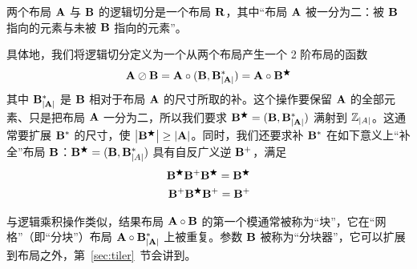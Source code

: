 \label{sec:logical_divide}

两个布局 $\mathbf{A}$ 与 $\mathbf{B}$ 的逻辑切分是一个布局 $\mathbf{R}$，其中“布局 $\mathbf{A}$ 被一分为二：被 $\mathbf{B}$ 指向的元素与未被 $\mathbf{B}$ 指向的元素”。

具体地，我们将逻辑切分定义为一个从两个布局产生一个 2 阶布局的函数
\begin{align*}
\mathbf{A} \oslash \mathbf{B} = \mathbf{A} \circ (\mathbf{B}, \mathbf{B}^*_{\left| {\mathbf{A}} \right|}) = \mathbf{A} \circ \mathbf{B}^\bigstar
\end{align*}
其中 $\mathbf{B}^*_{\left| {\mathbf{A}} \right|}$ 是 $\mathbf{B}$ 相对于布局 $\mathbf{A}$ 的尺寸所取的补。这个操作要保留 $\mathbf{A}$ 的全部元素、只是把布局 $\mathbf{A}$ 一分为二，所以我们要求 $\mathbf{B}^\bigstar = (\mathbf{B},\mathbf{B}^*_{\left| {\mathbf{A}} \right|})$ 满射到 $\mathbb{Z}_{\left| {A} \right|}$。这通常要扩展 $\mathbf{B}^*$ 的尺寸，使 $\left| {\mathbf{B}^\bigstar} \right| \geq \left| {\mathbf{A}} \right|$。同时，我们还要求补 $\mathbf{B}^*$ 在如下意义上“补全”布局 $\mathbf{B}$：$\mathbf{B}^\bigstar = (\mathbf{B},\mathbf{B}^*_{\left| {A} \right|})$ 具有自反广义逆 $\mathbf{B}^+$，满足
\begin{align}
\mathbf{B}^\bigstar \mathbf{B}^+ \mathbf{B}^\bigstar = \mathbf{B}^\bigstar \\
\mathbf{B}^+ \mathbf{B}^\bigstar \mathbf{B}^+ = \mathbf{B}^+
\end{align}

与逻辑乘积操作类似，结果布局 $\mathbf{A} \circ \mathbf{B}$ 的第一个模通常被称为“块”，它在“网格”（即“分块”）布局 $\mathbf{A} \circ \mathbf{B}^*_{\left| {\mathbf{A}} \right|}$ 上被重复。参数 $\mathbf{B}$ 被称为“分块器”，它可以扩展到布局之外，第~\ref{sec:tiler}~节会讲到。

